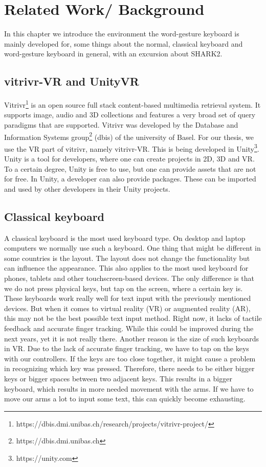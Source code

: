\chapter{Related Work/ Background}

In this chapter we introduce the environment the word-gesture keyboard is mainly developed for, some things about the normal, classical keyboard and word-gesture keyboard in general, with an excursion about SHARK2.

\section{vitrivr-VR and UnityVR}
Vitrivr\footnote{https://dbis.dmi.unibas.ch/research/projects/vitrivr-project/} is an open source full stack content-based multimedia retrieval system. It supports image, audio and 3D collections and features a very broad set of query paradigms that are supported. Vitrivr was developed by the Database and Information Systems group\footnote{https://dbis.dmi.unibas.ch} (dbis) of the university of Basel. For our thesis, we use the VR part of vitrivr, namely vitrivr-VR. This is being developed in Unity\footnote{https://unity.com}. Unity is a tool for developers, where one can create projects in 2D, 3D and VR. To a certain degree, Unity is free to use, but one can provide assets that are not for free. In Unity, a developer can also provide packages. These can be imported and used by other developers in their Unity projects.

\section{Classical keyboard}
A classical keyboard is the most used keyboard type. On desktop and laptop computers we normally use such a keyboard. One thing that might be different in some countries is the layout. The layout does not change the functionality but can influence the appearance. This also applies to the most used keyboard for phones, tablets and other touchscreen-based devices. The only difference is that we do not press physical keys, but tap on the screen, where a certain key is. These keyboards work really well for text input with the previously mentioned devices. But when it comes to virtual reality (VR) or augmented reality (AR), this may not be the best possible text input method. Right now, it lacks of tactile feedback and accurate finger tracking. While this could be improved during the next years, yet it is not really there. Another reason is the size of such keyboards in VR. Due to the lack of accurate finger tracking, we have to tap on the keys with our controllers. If the keys are too close together, it might cause a problem in recognizing which key was pressed. Therefore, there needs to be either bigger keys or bigger spaces between two adjacent keys. This results in a bigger keyboard, which results in more needed movement with the arms. If we have to move our arms a lot to input some text, this can quickly become exhausting.

